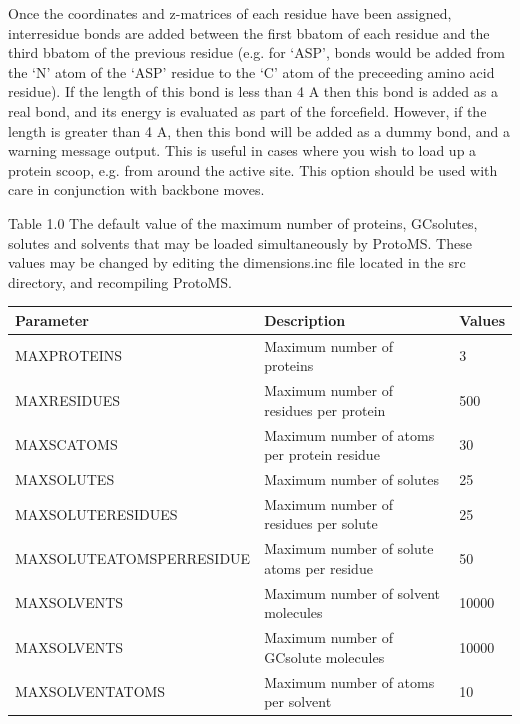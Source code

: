 \documentclass[letterpaper,10pt,english]{sphinxmanual}
\begin{document}
Once the coordinates and z-matrices of each residue have been assigned, interresidue bonds are added between the first bbatom of each residue and the third bbatom of the previous residue (e.g. for ‘ASP’, bonds would be added from the ‘N’ atom of the ‘ASP’ residue to the ‘C’ atom of the preceeding amino acid residue). If the length of this bond is less than 4 A then this bond is added as a real bond, and its energy is evaluated as part of the forcefield. However, if the length is greater than 4 A, then this bond will be added as a dummy bond, and a warning message output. This is useful in cases where you wish to load up a protein scoop, e.g. from around the active site. This option should be used with care in conjunction with backbone moves.


\begin{threeparttable}
\capstart\caption{Table 1.0 The default value of the maximum number of proteins, GCsolutes, solutes and solvents that may be loaded simultaneously by ProtoMS. These values may be changed by editing the dimensions.inc file located in the src directory, and recompiling ProtoMS.}

\begin{tabulary}{\linewidth}{|L|L|L|}
\hline
\textsf{\relax 
Parameter
} & \textsf{\relax 
Description
} & \textsf{\relax 
Values
}\\
\hline
MAXPROTEINS
 & 
Maximum number of proteins
 & 
3
\\

MAXRESIDUES
 & 
Maximum number of residues per protein
 & 
500
\\

MAXSCATOMS
 & 
Maximum number of atoms per protein residue
 & 
30
\\

MAXSOLUTES
 & 
Maximum number of solutes
 & 
25
\\

MAXSOLUTERESIDUES
 & 
Maximum number of residues per solute
 & 
25
\\

MAXSOLUTEATOMSPERRESIDUE
 & 
Maximum number of solute atoms per residue
 & 
50
\\

MAXSOLVENTS
 & 
Maximum number of solvent molecules
 & 
10000
\\

MAXSOLVENTS
 & 
Maximum number of GCsolute molecules
 & 
10000
\\

MAXSOLVENTATOMS
 & 
Maximum number of atoms per solvent
 & 
10
\\
\hline\end{tabulary}

\end{threeparttable}
\end{document}
